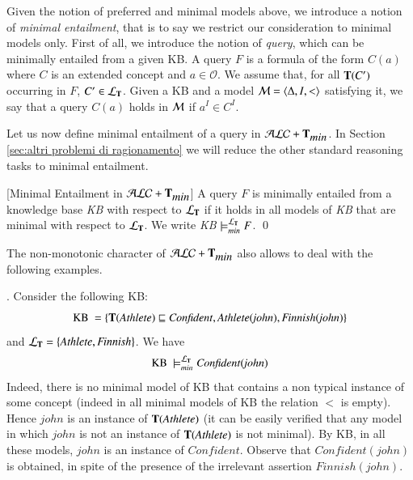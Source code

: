 \documentclass[a4paper, 11pt, oneside]{elsarticle}
\newcommand{\tip}{{\bf T}}
\newcommand{\alctmin}{\mathcal{ALC}+\tip_{\mbox{\em min}}}
\newcommand{\sqset}{\sqsubseteq}
\newcommand{\sx} {\langle}
\newcommand{\dx} {\rangle}
\newcommand{\ellet} {\mathcal{L}_{\bf T}}
\newcommand{\emme} {\begin{mathcal}M\end{mathcal}}
\newenvironment{definition}
{\begin{defi} \rm}{\qed \end{defi}}
\newcounter{posu}
\newtheorem{definition}[posu]{Definition}
\begin{document}
\noindent Given the notion of preferred and minimal models above, we introduce a notion of \emph{minimal entailment}, that is to say we restrict our consideration to minimal models only. First of all,
we introduce the notion of \emph{query}, which can be minimally entailed from a given KB.
A query $F$ is  a formula of the form $C(a)$ where $C$ is an extended concept and $a \in \mathcal{O}$.
We assume that, for all $\tip(C')$ occurring in $F$, $C' \in \ellet$.
Given a KB and a model $\emme=\sx \Delta, I, < \dx$ satisfying it, we say that a query $C(a)$ holds in $\emme$ if $a^I \in C^I$.

Let us now define minimal entailment of a query in $\alctmin$. In
Section \ref{sec:altri problemi di ragionamento} we will reduce
the other  standard reasoning tasks to minimal entailment.

\begin{definition}[Minimal Entailment in $\alctmin$]\label{LogicalConsequenceALCTMIN}
A query $F$  is minimally entailed from a
knowledge base \emph{KB} with respect to ${\ellet}$ if it holds in all
models of \emph{KB} that are minimal with respect to ${\ellet}$. We write \emph{KB}
$\models_{min}^{\ellet} F$.
\end{definition}


\noindent The non-monotonic character of $\alctmin$ also allows to deal with the following examples.

\vspace{0.5cm}


.
Consider the following KB:
$$\mbox{KB} \ = \{ \tip(\mathit{Athlete}) \sqset
\mathit{Confident}, \mathit{Athlete}(\mathit{john}),
\mathit{Finnish}(\mathit{john})\}$$ and ${\ellet}=
\{\mathit{Athlete}, \mathit{Finnish}\}$. We have $$\mbox{KB} \
\models_{min}^{\ellet} \mathit{Confident}(\mathit{john})$$
Indeed, there is no minimal model of KB that contains a non typical instance of some concept (indeed in all minimal models of KB the relation $<$ is empty).
Hence $\mathit{john}$ is an instance of $\tip(\mathit{Athlete})$
(it can be easily verified that any model in which $\mathit{john}$
is not an instance of $\tip(\mathit{Athlete})$ is not minimal).  By
KB, in all these models, $\mathit{john}$ is an instance of
$\mathit{Confident}$. Observe that $\mathit{Confident}(\mathit{john})$ is obtained, in spite of the
presence of the irrelevant assertion
$\mathit{Finnish}(\mathit{john})$.


\vspace{0.35cm}
\end{document}
